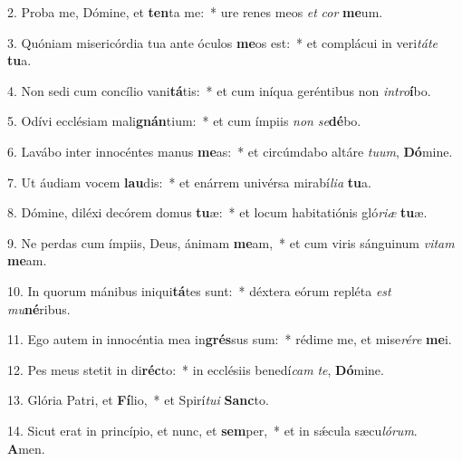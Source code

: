 2. Proba me, Dómine, et \textbf{ten}ta me:~*  ure renes meos \textit{et} \textit{cor} \textbf{me}um.\

3. Quóniam misericórdia tua ante óculos \textbf{me}os est:~*  et complácui in veri\textit{tá}\textit{te} \textbf{tu}a.\

4. Non sedi cum concílio vani\textbf{tá}tis:~*  et cum iníqua geréntibus non \textit{in}\textit{tro}\textbf{í}bo.\

5. Odívi ecclésiam mali\textbf{gnán}tium:~*  et cum ímpiis \textit{non} \textit{se}\textbf{dé}bo.\

6. Lavábo inter innocéntes manus \textbf{me}as:~*  et circúmdabo altáre \textit{tu}\textit{um}, \textbf{Dó}mine.\

7. Ut áudiam vocem \textbf{lau}dis:~*  et enárrem univérsa mirabí\textit{li}\textit{a} \textbf{tu}a.\

8. Dómine, diléxi decórem domus \textbf{tu}æ:~*  et locum habitatiónis gló\textit{ri}\textit{æ} \textbf{tu}æ.\

9. Ne perdas cum ímpiis, Deus, ánimam \textbf{me}am,~*  et cum viris sánguinum \textit{vi}\textit{tam} \textbf{me}am.\

10. In quorum mánibus iniqui\textbf{tá}tes sunt:~*  déxtera eórum repléta \textit{est} \textit{mu}\textbf{né}ribus.\

11. Ego autem in innocéntia mea in\textbf{grés}sus sum:~*  rédime me, et mise\textit{ré}\textit{re} \textbf{me}i.\

12. Pes meus stetit in di\textbf{réc}to:~*  in ecclésiis benedí\textit{cam} \textit{te}, \textbf{Dó}mine.\

13. Glória Patri, et \textbf{Fí}lio,~*  et Spirí\textit{tu}\textit{i} \textbf{Sanc}to.\

14. Sicut erat in princípio, et nunc, et \textbf{sem}per,~*  et in sǽcula sæcu\textit{ló}\textit{rum}. \textbf{A}men.\

